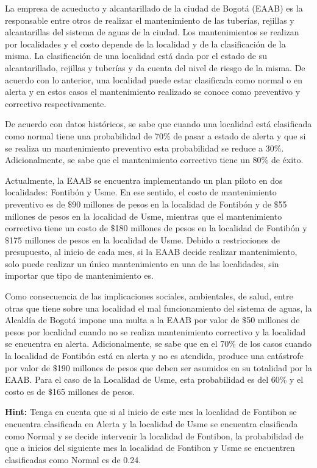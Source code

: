 \noindent La empresa de acueducto y alcantarillado de la ciudad de Bogotá (\textsc{EAAB}) es la responsable entre otros de realizar el mantenimiento de las tuberías, rejillas y alcantarillas del sistema de aguas de la ciudad. Los mantenimientos se realizan por localidades y el costo depende de la localidad y de la clasificación de la misma. La clasificación de una localidad está dada por el estado de su alcantarillado, rejillas y tuberías y da cuenta del nivel de riesgo de la misma. De acuerdo con lo anterior, una localidad puede estar clasificada como normal o en alerta y en estos casos el mantenimiento realizado se conoce como preventivo y correctivo respectivamente.

\noindent De acuerdo con datos históricos, se sabe que cuando una localidad está clasificada como normal tiene una probabilidad de 70\% de pasar a estado de alerta y que si se realiza un mantenimiento preventivo esta probabilidad se reduce a 30\%. Adicionalmente, se sabe que el mantenimiento correctivo tiene un 80\% de éxito.

\noindent Actualmente, la \textsc{EAAB} se encuentra implementando un plan piloto en dos localidades: Fontibón y Usme. En ese sentido, el costo de mantenimiento preventivo es de $\$$90 millones de pesos en la localidad de Fontibón y de $\$$55 millones de pesos en la localidad de Usme, mientras que el mantenimiento correctivo tiene un costo de $\$$180 millones de pesos en la localidad de Fontibón y $\$$175 millones de pesos en la localidad de Usme. Debido a restricciones de presupuesto, al inicio de cada mes, si la \textsc{EAAB} decide realizar mantenimiento, solo puede realizar un único mantenimiento en una de las localidades, sin importar que tipo de mantenimiento es.

\noindent Como consecuencia de las implicaciones sociales, ambientales, de salud, entre otras que tiene sobre una localidad el mal funcionamiento del sistema de aguas, la Alcaldía de Bogotá impone una multa a la \textsc{EAAB} por valor de $\$$50 millones de pesos por localidad cuando no se realiza mantenimiento correctivo y la localidad se encuentra en alerta. Adicionalmente, se sabe que en el 70\% de los casos cuando la localidad de Fontibón está en alerta y no es atendida, produce una catástrofe por valor de $\$$190 millones de pesos que deben ser asumidos en su totalidad por la \textsc{EAAB}. Para el caso de la Localidad de Usme, esta probabilidad es del 60\% y el costo es de $\$$165 millones de pesos.

\noindent \textbf{Hint:} Tenga en cuenta que si al inicio de este mes la localidad de Fontibon se encuentra clasificada en Alerta y la localidad de Usme se encuentra clasificada como Normal y se decide intervenir la localidad de Fontibon, la probabilidad de que a inicios del siguiente mes la localidad de Fontibon y Usme se encuentren clasificadas como Normal es de 0.24.

